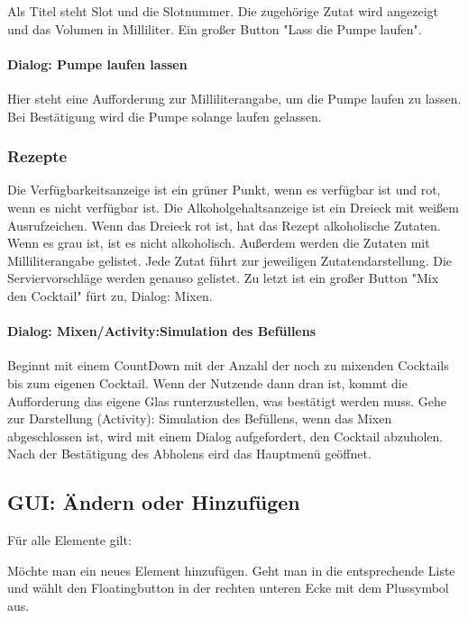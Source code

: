 {Als Titel steht Slot und die Slotnummer. Die zugehörige Zutat wird angezeigt und das Volumen in Milliliter. Ein großer Button "Lass die Pumpe laufen".

\paragraph{Dialog: Pumpe laufen lassen}

Hier steht eine Aufforderung zur Milliliterangabe, um die Pumpe laufen zu lassen. Bei Bestätigung wird die Pumpe solange laufen gelassen.

\subsubsection{Rezepte}

Die Verfügbarkeitsanzeige ist ein grüner Punkt, wenn es verfügbar ist und rot, wenn es nicht verfügbar ist. Die Alkoholgehaltsanzeige ist ein Dreieck mit weißem Ausrufzeichen. Wenn das Dreieck rot ist, hat das Rezept alkoholische Zutaten. Wenn es grau ist, ist es nicht alkoholisch. Außerdem werden die Zutaten mit Milliliterangabe gelistet. Jede Zutat führt zur jeweiligen Zutatendarstellung. Die Serviervorschläge werden genauso gelistet. Zu letzt ist ein großer Button "Mix den Cocktail" fürt zu, Dialog: Mixen.

\paragraph{Dialog: Mixen/Activity:Simulation des Befüllens}

Beginnt mit einem CountDown mit der Anzahl der noch zu mixenden Cocktails bis zum eigenen Cocktail. Wenn der Nutzende dann dran ist, kommt die Aufforderung das eigene Glas runterzustellen, was bestätigt werden muss. Gehe zur Darstellung (Activity): Simulation des Befüllens, wenn das Mixen abgeschlossen ist, wird mit einem Dialog aufgefordert, den Cocktail abzuholen. Nach der Bestätigung des Abholens eird das Hauptmenü geöffnet.



\subsection{GUI: Ändern oder Hinzufügen}

Für alle Elemente gilt:

Möchte man ein neues Element hinzufügen. Geht man in die entsprechende Liste und wählt den Floatingbutton in der rechten unteren Ecke mit dem Plussymbol aus.

}
